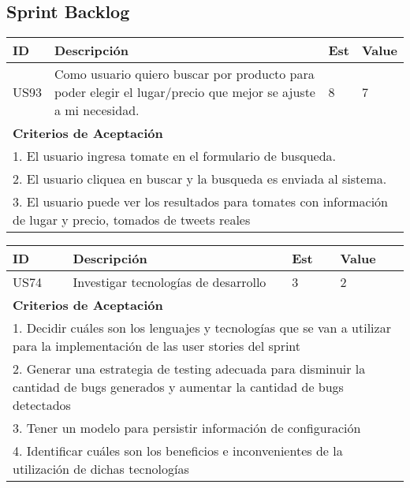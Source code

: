 \subsection{Sprint Backlog}

\bigskip
\begin{tabular}{|p{1cm}|p{10cm}|p{1cm}|p{1cm}|}
\hline
\hline
\textbf{ID}&\textbf{Descripción}&\textbf{Est}&\textbf{Value}\\
\hline
\hline
US93&Como usuario quiero buscar por producto para poder elegir el lugar/precio que mejor se ajuste a mi necesidad.& 8& 7\\
\hline
\hline
\multicolumn{4}{|p{13cm}|}{ \textbf{Criterios de Aceptación}} \\
\hline
\hline
\multicolumn{4}{|p{13cm}|}{1. El usuario ingresa tomate en el formulario de busqueda.}\\
\multicolumn{4}{|p{13cm}|}{2. El usuario cliquea en buscar y la busqueda es enviada al sistema.}\\
\multicolumn{4}{|p{13cm}|}{3. El usuario puede ver los resultados para tomates con información de lugar y precio, tomados de tweets reales}\\
\hline
\hline
\end{tabular}

\bigskip
\begin{tabular}{|p{1cm}|p{10cm}|p{1cm}|p{1cm}|}
\hline
\hline
\textbf{ID}&\textbf{Descripción}&\textbf{Est}&\textbf{Value}\\
\hline
\hline
US74&Investigar tecnologías de desarrollo&3&2\\
\hline
\hline
\multicolumn{4}{|p{13cm}|}{ \textbf{Criterios de Aceptación}} \\
\hline
\hline
\multicolumn{4}{|p{13cm}|}{1. Decidir cuáles son los lenguajes y tecnologías que se van a utilizar para la implementación de las user stories del sprint}\\
\multicolumn{4}{|p{13cm}|}{2. Generar una estrategia de testing adecuada para disminuir la cantidad de bugs generados y aumentar la cantidad de bugs detectados}\\
\multicolumn{4}{|p{13cm}|}{3. Tener un modelo para persistir información de configuración}\\
\multicolumn{4}{|p{13cm}|}{4. Identificar cuáles son los beneficios e inconvenientes de la utilización de dichas tecnologías}\\
\hline
\hline
\end{tabular}

